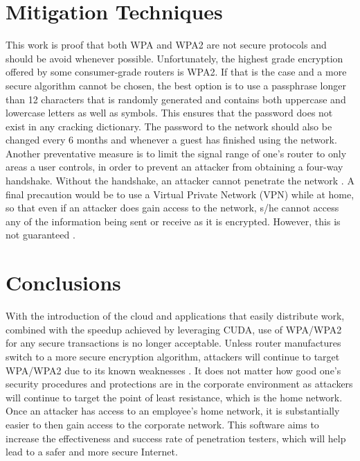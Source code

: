 \documentclass[12pt]{article}
\begin{document}
\section{Mitigation Techniques}
\indent This work is proof that both WPA and WPA2 are not secure protocols and should be avoid whenever possible. Unfortunately, the highest grade encryption offered by some consumer-grade routers is WPA2. If that is the case and a more secure algorithm cannot be chosen, the best option is to use a passphrase longer than 12 characters that is randomly generated and contains both uppercase and lowercase letters as well as symbols. This ensures that the password does not exist in any cracking dictionary. The password to the network should also be changed every 6 months and whenever a guest has finished using the network. Another preventative measure is to limit the signal range of one's router to only areas a user controls, in order to prevent an attacker from obtaining a four-way handshake. Without the handshake, an attacker cannot penetrate the network \cite{cck}. A final precaution would be to use a Virtual Private Network (VPN) while at home, so that even if an attacker does gain access to the network, s/he cannot access any of the information being sent or receive as it is encrypted. However, this is not guaranteed \cite{moxie}.


\section{Conclusions}
\indent With the introduction of the cloud and applications that easily distribute work, combined with the speedup achieved by leveraging CUDA, use of WPA/WPA2 for any secure transactions is no longer acceptable. Unless router manufactures switch to a more secure encryption algorithm, attackers will continue to target WPA/WPA2 due to its known weaknesses \cite{cck}. It does not matter how good one's security procedures and protections are in the corporate environment as attackers will continue to target the point of least resistance, which is the home network. Once an attacker has access to an employee’s home network, it is substantially easier to then gain access to the corporate network. This software aims to increase the effectiveness and success rate of penetration testers, which will help lead to a safer and more secure Internet. 
\end{document}
